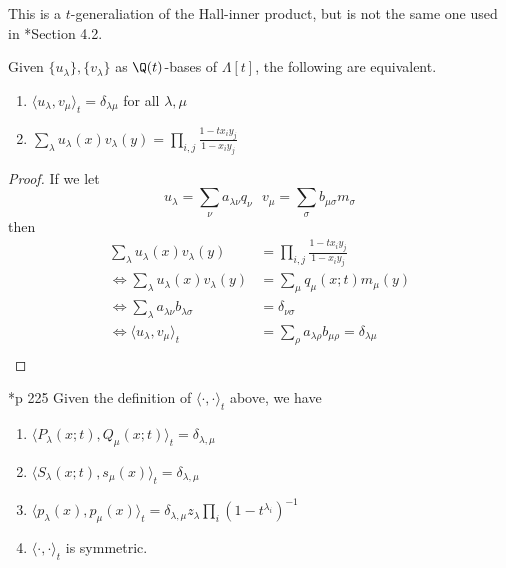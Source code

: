 \documentclass[11pt,leqno,oneside]{amsart}
\numberwithin{thm}{section}
\newcommand{\sym}{\Lambda}
\begin{document}
\begin{rmk}
  This is a \(t\)-generaliation of the Hall-inner product, but is not
  the same one used in \cite{alg-comb}*{Section 4.2}.
\end{rmk}
\begin{lem}\label{t-cauchy-kernel-equiv-to-dual-basis}
  Given \(\{u_\lambda\}, \{v_\lambda\}\) as \(\Q(t)\)-bases of \(\sym[t]\), the following are equivalent.
  \begin{enumerate}
  \item \(\langle u_\lambda, v_\mu \rangle_t = \delta_{\lambda \mu}\)
    for all \(\lambda,\mu\)
  \item \(\sum_\lambda u_\lambda(x) v_\lambda(y) = \prod_{i,j}
    \frac{1-t x_i y_j}{1-x_i y_j}\)
  \end{enumerate}
\end{lem}
\begin{proof}
  If we let \[
    u_\lambda = \sum_{\nu} a_{\lambda \nu} q_\nu \ \ \ v_\mu =
    \sum_{\sigma} b_{\mu \sigma} m_\sigma
  \]
  then 
  \begin{align*}
    \sum_\lambda u_\lambda(x) v_\lambda(y)
    & = \prod_{i,j} \frac{1-t x_i y_j}{1-x_i y_j} \\
    \iff \sum_\lambda u_\lambda(x) v_\lambda(y)
    & = \sum_\mu q_\mu(x;t) m_\mu(y)\\
    \iff \sum_\lambda a_{\lambda \nu} b_{\lambda \sigma}
    & = \delta_{\nu \sigma} \\
    \iff \langle u_\lambda, v_\mu \rangle_t
    & = \sum_\rho a_{\lambda \rho} b_{\mu \rho}
     = \delta_{\lambda \mu} \\
  \end{align*}
\end{proof}
\begin{prop}
  \cite{macdonald}*{p 225} Given the definition of \(\langle \cdot, \cdot \rangle_t\) above, we have
  \begin{enumerate}
  \item \(\langle P_\lambda(x;t), Q_\mu(x;t)\rangle_t =
    \delta_{\lambda,\mu}\)
  \item \(\langle S_\lambda(x;t), s_\mu(x) \rangle_t = \delta_{\lambda,
      \mu}\)
  \item \(\langle p_\lambda(x), p_\mu(x) \rangle_t =
    \delta_{\lambda,\mu} z_\lambda \prod_i (1-t^{\lambda_i})^{-1}\)
  \item \(\langle \cdot, \cdot \rangle_t\) is symmetric.
  \end{enumerate}
\end{prop}
\end{document}
